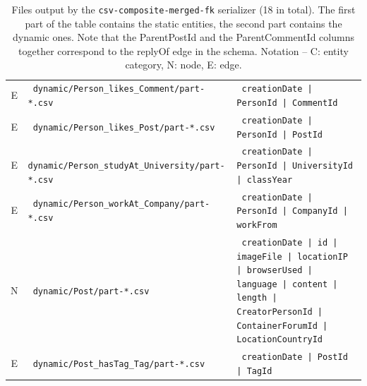 \begin{table}[htb]
\begin{tabularx}{\linewidth}{|>{\sffamily}c|>{\tt}l|>{\tt}X|}
        E                    & dynamic/Person\_likes\_Comment/part-*.csv        & creationDate | PersonId | CommentId \\
        E                    & dynamic/Person\_likes\_Post/part-*.csv           & creationDate | PersonId | PostId \\
        E                    & dynamic/Person\_studyAt\_University/part-*.csv   & creationDate | PersonId | UniversityId | classYear \\
        E                    & dynamic/Person\_workAt\_Company/part-*.csv       & creationDate | PersonId | CompanyId | workFrom \\
        \hline
        N                    & dynamic/Post/part-*.csv                          & creationDate | id | imageFile | locationIP | browserUsed | language | content | length | CreatorPersonId | ContainerForumId | LocationCountryId \\
        E                    & dynamic/Post\_hasTag\_Tag/part-*.csv             & creationDate | PostId | TagId \\
        \hline
    \end{tabularx}
    \caption{Files output by the \texttt{csv-composite-merged-fk} serializer (18 in total). The first part of the table contains the static entities, the second part contains the dynamic ones.
        Note that the \textsf{ParentPostId} and the \textsf{ParentCommentId} columns together correspond to the \textsf{replyOf} edge in the schema.
        Notation -- \textsf{C}: entity category, \textsf{N}: node, \textsf{E}: edge.}
    \label{table:csv-composite-merged-fk}
\end{table}
